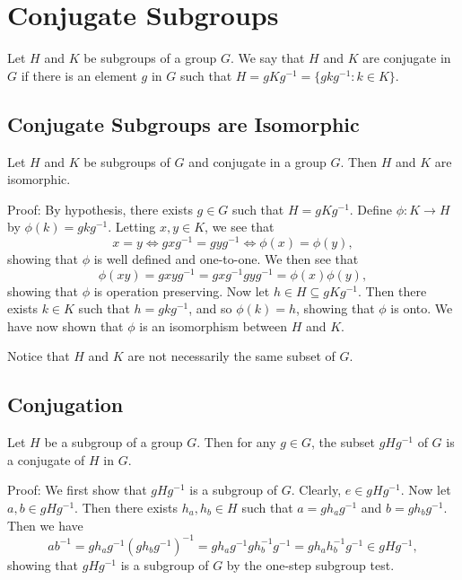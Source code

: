 \documentclass{article}
\begin{document}
\newcommand{\Z}{\mathbb{Z}}
\newcommand{\R}{\mathbb{R}}
\newcommand{\N}{\mathbb{N}}
\newcommand{\Q}{\mathbb{Q}}

\section*{Conjugate Subgroups}

Let $H$ and $K$ be subgroups of a group $G$.  We say that
$H$ and $K$ are conjugate in $G$ if there is an element $g$ in $G$
such that $H=gKg^{-1}=\{gkg^{-1}:k\in K\}$.

\subsection*{Conjugate Subgroups are Isomorphic}

Let $H$ and $K$ be subgroups of $G$ and conjugate in a group $G$.
Then $H$ and $K$ are isomorphic.

Proof: By hypothesis, there exists $g\in G$ such that $H=gKg^{-1}$.
Define $\phi:K\to H$ by $\phi(k)=gkg^{-1}$.  Letting $x,y\in K$,
we see that
\begin{equation*}
x=y\iff gxg^{-1}=gyg^{-1}\iff\phi(x)=\phi(y),
\end{equation*}
showing that $\phi$ is well defined and one-to-one.  We then see that
\begin{equation*}
\phi(xy)=gxyg^{-1}=gxg^{-1}gyg^{-1}=\phi(x)\phi(y),
\end{equation*}
showing that $\phi$ is operation preserving.  Now let $h\in H\subseteq gKg^{-1}$.
Then there exists $k\in K$ such that $h=gkg^{-1}$, and so $\phi(k)=h$, showing
that $\phi$ is onto.  We have now shown that $\phi$ is an isomorphism between
$H$ and $K$.

Notice that $H$ and $K$ are not necessarily the same subset of $G$.

\subsection*{Conjugation}

Let $H$ be a subgroup of a group $G$.  Then for any $g\in G$,
the subset $gHg^{-1}$ of $G$ is a conjugate of $H$ in $G$.

Proof:  We first show that $gHg^{-1}$ is a subgroup of $G$.
Clearly, $e\in gHg^{-1}$.  Now let $a,b\in gHg^{-1}$.  Then
there exists $h_a,h_b\in H$ such that $a=gh_ag^{-1}$ and $b=gh_bg^{-1}$.
Then we have
\begin{equation*}
ab^{-1}=gh_ag^{-1}(gh_bg^{-1})^{-1}=gh_ag^{-1}gh_b^{-1}g^{-1}=gh_ah_b^{-1}g^{-1}
\in gHg^{-1},
\end{equation*}
showing that $gHg^{-1}$ is a subgroup of $G$ by the one-step subgroup test.
\end{document}
